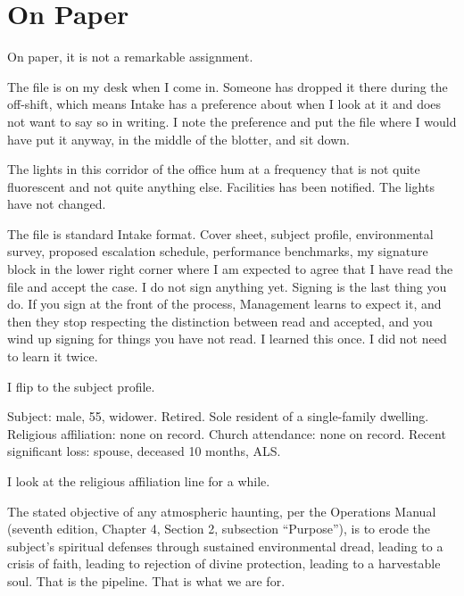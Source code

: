 
\chapter{On Paper}

On paper, it is not a remarkable assignment.

The file is on my desk when I come in. Someone has dropped it there during the off-shift, which means Intake has a preference about when I look at it and does not want to say so in writing. I note the preference and put the file where I would have put it anyway, in the middle of the blotter, and sit down.

The lights in this corridor of the office hum at a frequency that is not quite fluorescent and not quite anything else. Facilities has been notified. The lights have not changed.

The file is standard Intake format. Cover sheet, subject profile, environmental survey, proposed escalation schedule, performance benchmarks, my signature block in the lower right corner where I am expected to agree that I have read the file and accept the case. I do not sign anything yet. Signing is the last thing you do. If you sign at the front of the process, Management learns to expect it, and then they stop respecting the distinction between read and accepted, and you wind up signing for things you have not read. I learned this once. I did not need to learn it twice.

I flip to the subject profile.

Subject: male, 55, widower. Retired. Sole resident of a single-family dwelling. Religious affiliation: none on record. Church attendance: none on record. Recent significant loss: spouse, deceased 10 months, ALS.

I look at the religious affiliation line for a while.

The stated objective of any atmospheric haunting, per the Operations Manual (seventh edition, Chapter 4, Section 2, subsection ``Purpose''), is to erode the subject's spiritual defenses through sustained environmental dread, leading to a crisis of faith, leading to rejection of divine protection, leading to a harvestable soul. That is the pipeline. That is what we are for.

